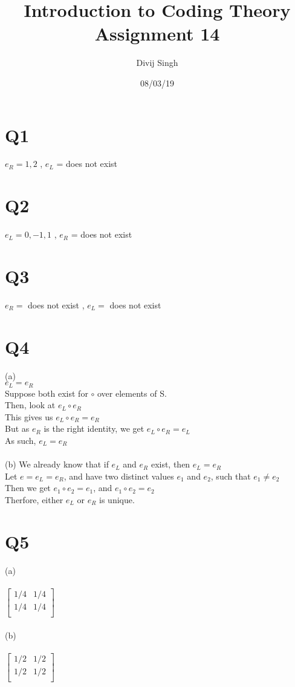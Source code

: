 \documentclass{article}
\title{Introduction to Coding Theory Assignment 14}
\author{Divij Singh}
\date{08/03/19}
\begin{document}
	\maketitle
	
	\section{Q1}
	$e_R = 1,2$ , $e_L$ = does not exist
\section{Q2}
$e_L = 0,-1,1$ , $e_R$ = does not exist
\section{Q3}
$e_R =$  does not exist , $e_L =$ does not exist
\section{Q4}
(a)\\
$e_L = e_R$\\
Suppose both exist for $\circ$ over elements of S.\\
Then, look at $e_L \circ e_R$\\
This gives us $e_L \circ e_R = e_R$\\
But as $e_R$ is the right identity, we get $e_L \circ e_R = e_L$\\
As such, $e_L = e_R$\\\\
(b)
We already know that if $e_L$ and $e_R$ exist, then $e_L = e_R$\\
Let $e = e_L = e_R$, and have two distinct values $e_1$ and $e_2$, such that $e_1 \neq e_2$\\
Then we get $e_1 \circ e_2 = e_1$, and $e_1 \circ e_2 = e_2$\\
Therfore, either $e_L$ or $e_R$ is unique.
\section{Q5}
(a)\\\\
\(
\begin{bmatrix}
1/4 & 1/4\\
1/4 & 1/4\\
\end{bmatrix}
\)
\\\\
(b)\\\\
\(
\begin{bmatrix}
1/2 & 1/2\\
1/2 & 1/2\\
\end{bmatrix}
\)
\end{document}

